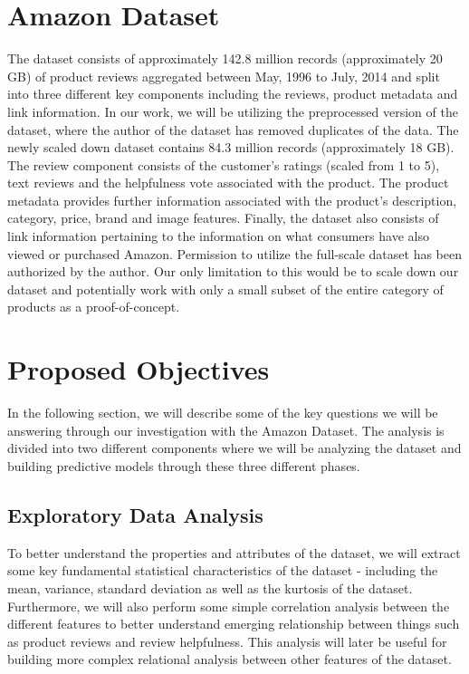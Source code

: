 \documentclass[a4paper, 11pt]{article}
\begin{document}
\section*{Amazon Dataset}
The dataset consists of approximately 142.8 million records (approximately 20 GB) of product reviews aggregated between May, 1996 to July, 2014 and split into three different key components including the reviews, product metadata and link information. In our work, we will be utilizing the preprocessed version of the dataset, where the author of the dataset has removed duplicates of the data. The newly scaled down dataset contains 84.3 million records (approximately 18 GB). The review component consists of the customer's ratings (scaled from 1 to 5), text reviews and the helpfulness vote associated with the product. The product metadata provides further information associated with the product's description, category, price, brand and image features. Finally, the dataset also consists of link information pertaining to the information on what consumers have also viewed or purchased Amazon. Permission to utilize the full-scale dataset has been authorized by the author. Our only limitation to this would be to scale down our dataset and potentially work with only a small subset of the entire category of products as a proof-of-concept.

\section*{Proposed Objectives}
In the following section, we will describe some of the key questions we will be answering through our investigation with the Amazon Dataset. The analysis is divided into two different components where we will be analyzing the dataset and building predictive models through these three different phases.

\subsection{Exploratory Data Analysis}
To better understand the properties and attributes of the dataset, we will extract some key fundamental statistical characteristics of the dataset - including the mean, variance, standard deviation as well as the kurtosis of the dataset. Furthermore, we will also perform some simple correlation analysis between the different features to better understand emerging relationship between things such as product reviews and review helpfulness. This analysis will later be useful for building more complex relational analysis between other features of the dataset.
\end{document}
